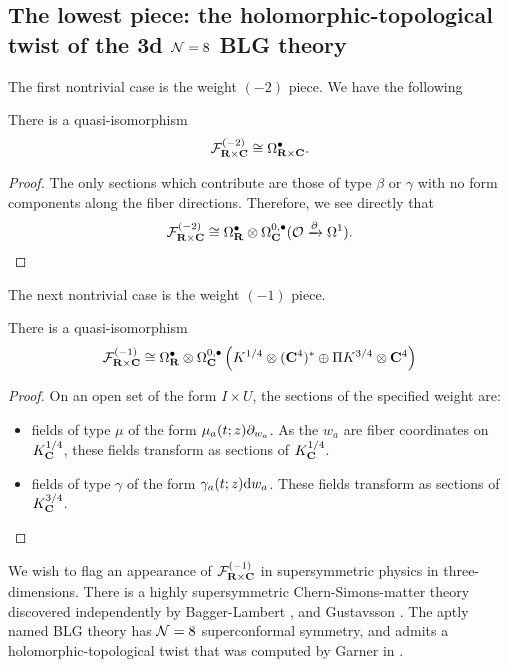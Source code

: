 \documentclass[../main.tex]{subfiles}
\begin{document}
\subsection{The lowest piece: the holomorphic-topological twist of the 3d $\mathcal{N}=8$ BLG theory}\label{sec:BLG}
\parsec[] The first nontrivial case is the weight ${(-2)}$ piece. We have the following

\begin{lem}
There is a quasi-isomorphism \[\mathcal{F}^{(-2)}_{\mathbf{R}\times \mathbf{C}} \cong \Omega^\bullet_{\mathbf{R}\times \mathbf{C}}.\]
\end{lem}
\begin{proof}
The only sections which contribute are those of type $\beta$ or $\gamma$ with no form components along the fiber directions. Therefore, we see directly that \[\mathcal{F}^{(-2)}_{\mathbf{R}\times \mathbf{C}} \cong \Omega^\bullet _{\mathbf{R}} \otimes \Omega^{0,\bullet}_{\mathbf{C}} ( \mathcal{O} \xrightarrow{\partial} \Omega^1 ).\] 
\end{proof}

\parsec[] The next nontrivial case is the weight ${(-1)}$ piece. 

\begin{lem}
There is a quasi-isomorphism \[ \mathcal{F}^{(-1)}_{\mathbf{R}\times \mathbf{C}} \cong \Omega^\bullet _{\mathbf{R}} \otimes \Omega^{0,\bullet}_{\mathbf{C}} \left (K^{1/4}\otimes (\mathbf{C}^4)^* \oplus \Pi K^{3/4}\otimes \mathbf{C}^4 \right ) \]
\end{lem}
\begin{proof}
On an open set of the form $I\times U$, the sections of the specified weight are:
\begin{itemize}
\item fields of type $\mu$ of the form $\mu_a(t; z) \partial_{w_a}$. As the $w_a$ are fiber coordinates on $K^{1/4}_{\mathbf{C}}$, these fields transform as sections of $K^{1/4}_{\mathbf{C}}$.
\item fields of type $\gamma$ of the form $\gamma_a(t;z) \mathrm{d} w_a$. These fields transform as sections of $K^{3/4}_{\mathbf{C}}$. 
\end{itemize}
\end{proof}

\parsec[]
We wish to flag an appearance of $\mathcal{F}^{(-1)}_{\mathbf{R}\times \mathbf{C}}$ in supersymmetric physics in three-dimensions. There is a highly supersymmetric Chern-Simons-matter theory discovered independently by Bagger-Lambert \cite{Bagger_2007}, \cite{Bagger:2007jr} and Gustavsson \cite{Gustavsson:2007vu}. The aptly named BLG theory has $\mathcal{N}=8$ superconformal symmetry, and admits a holomorphic-topological twist that was computed by Garner in \cite{Garner2022vds}. 
\end{document}
